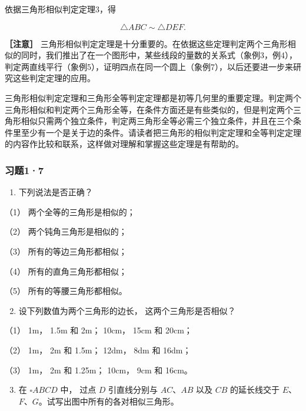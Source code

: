 依据三角形相似判定定理3，得

\[
\triangle A B C \sim \triangle D E F.
\]

\textbf{［注意］}
三角形相似判定定理是十分重要的。在依据这些定理判定两个三角形相似的同时，我们推出了在一个图形中，某些线段的量数的关系式（象例3，例4），判定两直线平行（象例5），证明四点在同一个圆上（象例7），以后还要进一步来研究这些判定定理的应用。

三角形相似判定定理和三角形全等判定定理都是初等几何里的重要定理。判定两个三角形相似和判定两个三角形全等，在条件方面还是有些类似的，但是判定两个三角形相似只需两个独立条件，判定两三角形全等必需三个独立条件，并且在三个条件里至少有一个是关于边的条件。请读者把三角形的相似判定定理和全等判定定理的内容作比较和联系，这样做对理解和掌握这些定理是有帮助的。

\subsubsection{习题1·7}

\begin{enumerate}
\item
  下列说法是否正确？
\end{enumerate}

（1） 两个全等的三角形是相似的；

（2） 两个钝角三角形是相似的；

（3） 所有的等边三角形都相似；

（4） 所有的直角三角形都相似；

（5） 所有的等腰三角形都相似。

\begin{enumerate}
\setcounter{enumi}{1}
\item
  设下列数值为两个三角形的边长， 这两个三角形是否相似？
\end{enumerate}

（1） 1m， 1.5m 和 2m； 10cm， 15cm 和 20cm；

（2） 1m， 2m 和 1.5m； 12dm， 8dm 和 16dm；

（3） 1m， 2m 和 1.25m； 10cm， 9cm 和 16cm。

\begin{enumerate}
\setcounter{enumi}{2}
\item
  在 \(\square ABCD\) 中， 过点 \(D\) 引直线分别与 \(AC\)、\(AB\) 以及
  \(CB\) 的延长线交于
  \(E\)、\(F\)、\(G\)。试写出图中所有的各对相似三角形。
\end{enumerate}

